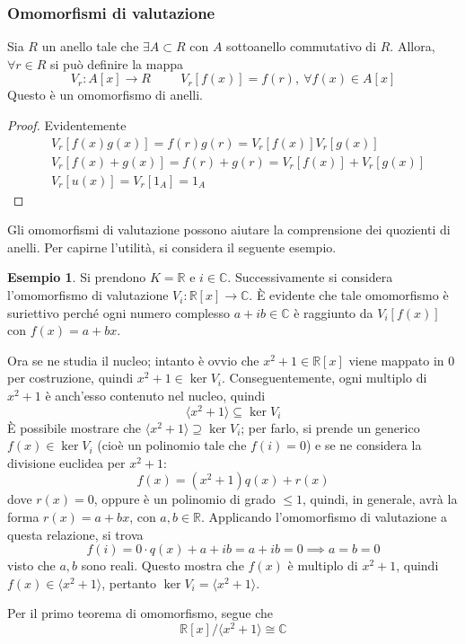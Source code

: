 \documentclass[11pt, a4paper]{scrartcl}
\theoremstyle{definition}
\newtheorem{esempio}{Esempio}
\numberwithin{esempio}{section}
\theoremstyle{definition}
\numberwithin{obs}{section}
\numberwithin{nota}{section}
\numberwithin{equation}{subsection}
\begin{document}
\subsubsection{Omomorfismi di valutazione}
Sia $R$ un anello tale che $\exists A \subset R$ con $A$ sottoanello commutativo di $R$.
Allora, $\forall r \in R$ si pu\`o definire la mappa
\[
	V_r : A[x] \to R \hspace{1cm} V_r[f(x)] = f(r), \ \forall f(x) \in A[x]
\] 
Questo \`e un omomorfismo di anelli.
\begin{proof}
	Evidentemente
	\[
	\begin{split}
		&V_r [f(x) g(x)]= f(r) g(r) = V_r[f(x)]V_r[g(x)]\\
		&V_r [f(x) + g(x)] = f(r) + g(r) = V_r[f(x)] + V_r[g(x)]\\
		&V_r[u(x)] = V_r[1_A] = 1_A
	\end{split}
	\] 
\end{proof}
Gli omomorfismi di valutazione possono aiutare la comprensione dei quozienti di anelli.
Per capirne l'utilit\`a, si considera il seguente esempio.
\begin{esempio}
Si prendono $K = \mathbb{R}$ e $i \in \mathbb{C}$.
Successivamente si considera l'omomorfismo di valutazione $V_i : \mathbb{R}[x] \to \mathbb{C}$.
\`E evidente che tale omomorfismo \`e suriettivo perch\'e ogni numero complesso $a+ib \in \mathbb{C}$ \`e raggiunto da $V_i[f(x)]$ con $f(x) = a + bx$.

Ora se ne studia il nucleo; intanto \`e ovvio che $x^2 + 1 \in \mathbb{R}[x]$ viene mappato in $0$ per costruzione, quindi $x^2 + 1 \in \operatorname{ker} V_i $.
Conseguentemente, ogni multiplo di $x^2 + 1$ \`e anch'esso contenuto nel nucleo, quindi 
\[
\langle x^2 +1  \rangle \subseteq \operatorname{ker} V_i
\] 
\`E possibile mostrare che $\langle x^2 + 1 \rangle\supseteq \operatorname{ker} V_i$; per farlo, si prende un generico $f(x) \in \operatorname{ker} V_i$ (cio\`e un polinomio tale che $f(i) = 0$) e se ne considera la divisione euclidea per $x^2 +1 $:
\[
f(x) = (x^2 +1) q(x) + r(x)
\] 
dove $r(x)=0$, oppure \`e un polinomio di grado $\le 1$, quindi, in generale, avr\`a la forma $r(x) = a +bx$, con $a,b \in \mathbb{R}$. 
Applicando l'omomorfismo di valutazione a questa relazione, si trova
\[
f(i) = 0\cdot q(x) + a + ib = a+ib = 0 \implies a = b = 0
\] 
visto che $a,b$ sono reali.
Questo mostra che $f(x) $ \`e multiplo di $x^2 + 1$, quindi $f(x) \in \langle x^2 + 1 \rangle$, pertanto $\operatorname{ker} V_i = \langle x^2 + 1 \rangle$.

Per il primo teorema di omomorfismo, segue che 
\[
	\mathbb{R}[x] / \langle x^2 + 1 \rangle \cong \mathbb{C}
\] 
\end{esempio}
\end{document}
